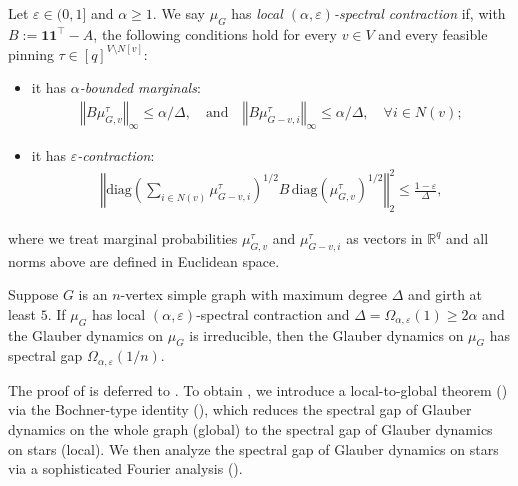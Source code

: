 \documentclass[a4paper,12pt]{article}
\theoremstyle{plain}
\theoremstyle{definition}
\def\*#1{\mathbf{#1}} %
\def\-#1{\mathrm{#1}} %
\def\*#1{\boldsymbol{#1}} %
\def\-#1{\mathrm{#1}} %
\renewcommand{\epsilon}{\varepsilon}
\newcommand{\norm}[1]{\left\Vert#1\right\Vert}
\newcommand{\tuple}[1]{\left(#1\right)}
\newcommand{\tp}{\tuple}
\begin{document}
\begin{condition}\label{cond-local-spectral-contraction}
  Let $\epsilon \in (0,1]$ and $\alpha \geq 1$.
  We say $\mu_G$ has \emph{local $(\alpha,\epsilon)$-spectral contraction} if, with $B := \*1\*1^\intercal - A$, the following conditions hold for every $v \in V$ and every feasible pinning $\tau \in [q]^{V\setminus N[v]}$:
  \begin{itemize}
  \item it has \emph{$\alpha$-bounded marginals}:
    \begin{align*}
      \norm{B\mu^\tau_{G,v}}_{\infty} \leq \alpha/\Delta,
      \quad \text{and} \quad \norm{B\mu^\tau_{G-v,i}}_\infty \leq \alpha/\Delta, \quad \forall i \in N(v);
    \end{align*}
  \item it has \emph{$\epsilon$-contraction}:
    \begin{align*}
        \norm{
        \-{diag}\tp{\sum_{i\in N(v)} \mu^\tau_{G-v,i}}^{1/2}
        B
        \,\-{diag}\tp{\mu^\tau_{G,v}}^{1/2}
        }_{2}^2 \leq \frac{1-\epsilon}{\Delta},
    \end{align*}
  \end{itemize}
  where we treat marginal probabilities $\mu^\tau_{G,v}$ and $\mu^\tau_{G-v,i}$ as vectors in $\mathbb{R}^q$ and all norms above are  defined in Euclidean space.
\end{condition}

\begin{theorem}\label{thm:general}
  Suppose $G$ is an $n$-vertex simple graph with maximum degree $\Delta$ and girth at least $5$.
  If $\mu_G$ has local $(\alpha,\epsilon)$-spectral contraction and $\Delta = \Omega_{\alpha,\epsilon}(1) \geq 2\alpha$ and the Glauber dynamics on $\mu_G$ is irreducible, then the Glauber dynamics on $\mu_G$ has spectral gap $\Omega_{\alpha,\epsilon}(1/n)$.
\end{theorem}

The proof of  is deferred to .
To obtain , we introduce a local-to-global theorem () via the Bochner-type identity (), which reduces the spectral gap of Glauber dynamics on the whole graph (global) to the spectral gap of Glauber dynamics on stars (local).
We then analyze the spectral gap of Glauber dynamics on stars via a sophisticated Fourier analysis ().
\end{document}
